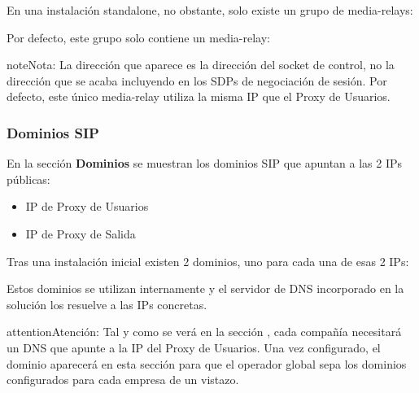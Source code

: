 \documentclass[letterpaper,10pt,spanish]{sphinxmanual}
\begin{document}
En una instalación standalone, no obstante, solo existe un grupo de media-relays:

\noindent{}

Por defecto, este grupo solo contiene un media-relay:

\noindent{}

\begin{notice}{note}{Nota:}
La dirección que aparece es la dirección del socket de control, no la dirección que se acaba incluyendo en los SDPs de negociación de sesión. Por defecto, este único media-relay utiliza la misma IP que el Proxy de Usuarios.
\end{notice}


\subsubsection{Dominios SIP}
\label{internal_calls/god_portal:sip-domains}\label{internal_calls/god_portal:god-sipdomains}
En la sección \textbf{Dominios} se muestran los dominios SIP que apuntan a las 2 IPs públicas:
\begin{itemize}
\item {} 
IP de Proxy de Usuarios

\item {} 
IP de Proxy de Salida

\end{itemize}

Tras una instalación inicial existen 2 dominios, uno para cada una de esas 2 IPs:

\noindent{}

Estos dominios se utilizan internamente y el servidor de DNS incorporado en la solución los resuelve a las IPs concretas.

\begin{notice}{attention}{Atención:}
Tal y como se verá en la sección {\hyperref[internal_calls/brand_portal:domain\string-per\string-company]{}}, cada compañía necesitará un DNS que apunte a la IP del Proxy de Usuarios. Una vez configurado, el dominio aparecerá en esta sección para que el operador global sepa los dominios configurados para cada empresa de un vistazo.
\end{notice}
\end{document}

